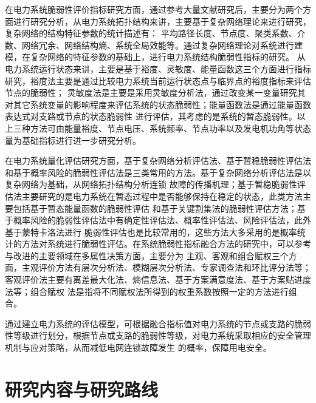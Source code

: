 在电力系统脆弱性评价指标研究方面，通过参考大量文献研究后，主要分为两个方面进行研究分析，从电力系统拓扑结构来讲，主要基于复杂网络理论来进行研究，复杂网络的结构特征参数的统计描述有：
平均路径长度、节点度、聚类系数、介数、网络冗余、网络结构熵、系统全局效能等。通过复杂网络理论对系统进行建模，在复杂网络的特征参数的基础上，进行电力系统结构脆弱性指标的研究。
从电力系统运行状态来讲，主要是基于裕度、灵敏度、能量函数这三个方面进行指标研究，裕度法主要是通过比较电力系统当前运行状态点与临界点的裕度指标来评估节点的脆弱性\cite{refs42,refs43,refs44}；
灵敏度法是主要是采用灵敏度分析法，通过改变某一变量研究其对其它系统变量的影响程度来评估系统的状态脆弱性\cite{refs45,refs46}；能量函数法是通过能量函数表达式对支路或节点的状态脆弱性
进行评估，其考虑的是系统的暂态脆弱性\cite{refs47,refs48,refs49}。以上三种方法可由能量裕度、节点电压、系统频率、节点功率以及发电机功角等状态量为基础指标进行进一步研究分析。

在电力系统量化评估研究方面，基于复杂网络分析评估法、基于暂稳脆弱性评估法和基于概率风险的脆弱性评估法是三类常用的方法。基于复杂网络分析评估法是以复杂网络为基础，从网络拓扑结构分析连锁
故障的传播机理\cite{refs50,refs51,refs52}；基于暂稳脆弱性评估法主要研究的是电力系统在暂态过程中是否能够保持在稳定的状态，此类方法主要包括基于暂态能量函数的脆弱性评估\cite{refs53}
和基于关键割集法的脆弱性评估方法\cite{refs54}；基于概率风险的脆弱性评估法中有确定性评估法\cite{refs55}、概率性评估法\cite{refs56}、风险评估法\cite{refs57}，此外基于蒙特卡洛法进行
脆弱性评估\cite{refs58}也是比较常用的，这些方法大多采用的是概率统计的方法对系统进行脆弱性评估。在系统脆弱性指标融合方法的研究中，可以参考与改进的主要领域在多属性决策方面，主要分为
主观、客观和组合赋权三个方面，主观评价方法有层次分析法、模糊层次分析法、专家调查法和环比评分法等；客观评价法主要有离差最大化法、熵信息法、基于方案满意度法、基于方案贴进度法等；组合赋权
法是指将不同赋权法所得到的权重系数按照一定的方法进行组合\cite{refs59}。

通过建立电力系统的评估模型，可根据融合指标值对电力系统的节点或支路的脆弱性等级进行划分，根据节点或支路的脆弱性等级，对电力系统采取相应的安全管理机制与应对策略，从而减低电网连锁故障发生
的概率，保障用电安全。



\section{研究内容与研究路线}
\label{sec:research_curise}

